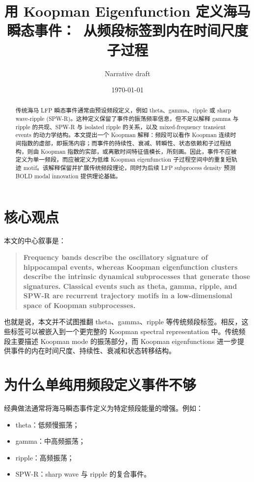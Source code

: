 \documentclass[11pt,a4paper]{ctexart}
\title{用 Koopman Eigenfunction 定义海马瞬态事件：\
从频段标签到内在时间尺度子过程}
\author{Narrative draft}
\date{\today}
\begin{document}
\maketitle

\begin{abstract}
传统海马 LFP 瞬态事件通常由预设频段定义，例如 theta、gamma、ripple 或 sharp wave-ripple (SPW-R)。这种定义保留了事件的振荡频率信息，但不足以解释 gamma 与 ripple 的共现、SPW-R 与 isolated ripple 的关系，以及 mixed-frequency transient events 的动力学结构。本文提出一个 Koopman 解释：频段可以看作 Koopman 连续时间指数的虚部，即振荡内容；而事件的持续性、衰减、转瞬性、状态依赖和子过程结构，则由 Koopman 指数的实部，或离散时间特征值模长，所刻画。因此，事件不应被定义为单一频段，而应被定义为低维 Koopman eigenfunction 子过程空间中的重复短轨迹 motif。该解释保留并扩展传统频段理论，同时为后续 LFP subprocess density 预测 BOLD modal innovation 提供理论基础。
\end{abstract}

\section{核心观点}

本文的中心叙事是：
\begin{quote}
\textbf{Frequency bands describe the oscillatory signature of hippocampal events, whereas Koopman eigenfunction clusters describe the intrinsic dynamical subprocesses that generate those signatures. Classical events such as theta, gamma, ripple, and SPW-R are recurrent trajectory motifs in a low-dimensional space of Koopman subprocesses.}
\end{quote}

也就是说，本文并不试图推翻 theta、gamma、ripple 等传统频段标签。相反，这些标签可以被嵌入到一个更完整的 Koopman spectral representation 中。传统频段主要描述 Koopman mode 的振荡部分，而 Koopman eigenfunctions 进一步提供事件的内在时间尺度、持续性、衰减和状态转移结构。

\section{为什么单纯用频段定义事件不够}

经典做法通常将海马瞬态事件定义为特定频段能量的增强。例如：
\begin{itemize}[leftmargin=2em]
    \item theta：低频慢振荡；
    \item gamma：中高频振荡；
    \item ripple：高频振荡；
    \item SPW-R：sharp wave 与 ripple 的复合事件。
\end{itemize}
\end{document}

